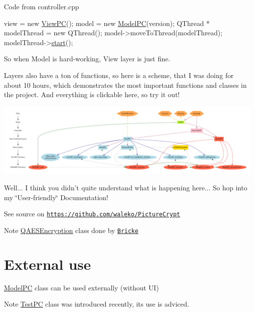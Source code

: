 Code from controller.\-cpp 
\begin{DoxyCode}
view = \textcolor{keyword}{new} \hyperlink{class_view_p_c}{ViewPC}();
model = \textcolor{keyword}{new} \hyperlink{class_model_p_c}{ModelPC}(version);
QThread * modelThread = \textcolor{keyword}{new} QThread();
model->moveToThread(modelThread);
modelThread->\hyperlink{class_model_p_c_a3cae34fd5bcb06e8c1f8cfe7961bd270}{start}();
\end{DoxyCode}
 So when Model is hard-\/working, View layer is just fine.

Layers also have a ton of functions, so here is a scheme, that I was doing for about 10 hours, which demonstrates the most important functions and classes in the project. And everything is clickable here, so try it out! 
\begin{DoxyImageNoCaption}
  \mbox{\includegraphics[width=\textwidth,height=\textheight/2,keepaspectratio=true]{dot_mainpage}}
\end{DoxyImageNoCaption}
 Well... I think you didn't quite understand what is happening here... So hop into my \char`\"{}\-User-\/friendly\char`\"{} Documentation!

See source on \href{https://github.com/waleko/PictureCrypt}{\tt https\-://github.\-com/waleko/\-Picture\-Crypt}

\begin{DoxyNote}{Note}
\hyperlink{class_q_a_e_s_encryption}{Q\-A\-E\-S\-Encryption} class done by \href{https://github.com/bricke}{\tt Bricke}
\end{DoxyNote}
\hypertarget{index_ext-use}{}\section{External use}\label{index_ext-use}
\hyperlink{class_model_p_c}{Model\-P\-C} class can be used externally (without U\-I) \begin{DoxyNote}{Note}
\hyperlink{class_test_p_c}{Test\-P\-C} class was introduced recently, its use is adviced.
\end{DoxyNote}

